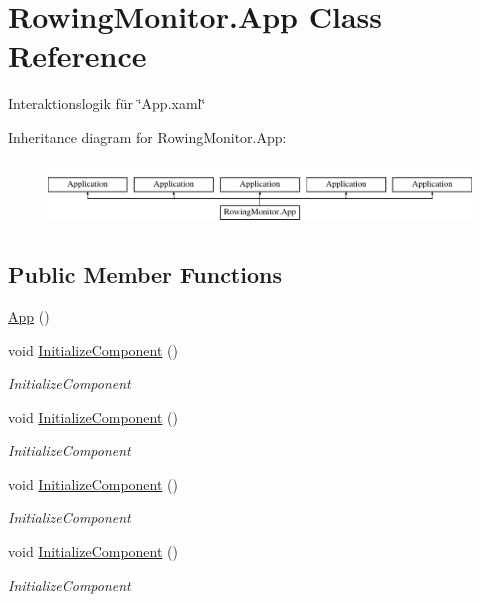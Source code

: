 \hypertarget{class_rowing_monitor_1_1_app}{}\section{Rowing\+Monitor.\+App Class Reference}
\label{class_rowing_monitor_1_1_app}


Interaktionslogik für \char`\"{}\+App.\+xaml\char`\"{}  


Inheritance diagram for Rowing\+Monitor.\+App\+:\begin{figure}[H]
\begin{center}
\leavevmode
\includegraphics[height=1.709924cm]{class_rowing_monitor_1_1_app}
\end{center}
\end{figure}
\subsection*{Public Member Functions}
\begin{DoxyCompactItemize}
\item 
\hyperlink{class_rowing_monitor_1_1_app_a83d9e8a13163628ae72525843d35bbfe}{App} ()
\item 
void \hyperlink{class_rowing_monitor_1_1_app_a92cbce86d55626b5b411b795ec66c0c2}{Initialize\+Component} ()
\begin{DoxyCompactList}\small\item\em Initialize\+Component \end{DoxyCompactList}\item 
void \hyperlink{class_rowing_monitor_1_1_app_a92cbce86d55626b5b411b795ec66c0c2}{Initialize\+Component} ()
\begin{DoxyCompactList}\small\item\em Initialize\+Component \end{DoxyCompactList}\item 
void \hyperlink{class_rowing_monitor_1_1_app_a92cbce86d55626b5b411b795ec66c0c2}{Initialize\+Component} ()
\begin{DoxyCompactList}\small\item\em Initialize\+Component \end{DoxyCompactList}\item 
void \hyperlink{class_rowing_monitor_1_1_app_a92cbce86d55626b5b411b795ec66c0c2}{Initialize\+Component} ()
\begin{DoxyCompactList}\small\item\em Initialize\+Component \end{DoxyCompactList}\end{DoxyCompactItemize}
